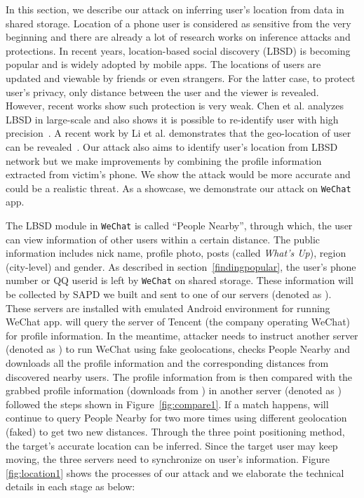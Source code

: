 \documentclass{sig-alternate}
\begin{document}
In this section, we describe our attack on inferring user's location from data in shared storage. Location of a phone user is considered as sensitive from the very beginning and there are already a lot of research works on inference attacks and protections. In recent years, location-based social discovery (LBSD) is becoming popular and is widely adopted by mobile apps. The locations of users are updated and viewable by friends or even strangers. For the latter case, to protect user's privacy, only distance between the user and the viewer is revealed. However, recent works show such protection is very weak. Chen et al. analyzes LBSD in large-scale and also shows it is possible to re-identify user with high precision~\cite{chen2013and}. A recent work by Li et al. demonstrates that the geo-location of user can be revealed~\cite{li2013all}. Our attack also aims to identify user's location from LBSD network but we make improvements by combining the profile information extracted from victim's phone. We show the attack would be more accurate and could be a realistic threat. As a showcase, we demonstrate our attack on \texttt{WeChat} app.



The LBSD module in \texttt{WeChat} is called ``People Nearby'', through which, the user can view information of other users within a certain distance. The public information includes nick name, profile photo, posts (called \textit{What's Up}), region (city-level) and gender. As described in section~\ref{findingpopular}, the user's phone number or QQ userid is left by \texttt{WeChat} on shared storage. These information will be collected by SAPD we built and sent to one of our servers (denoted as ). These servers are installed with emulated Android environment for running WeChat app.  will query the server of Tencent (the company operating WeChat) for profile information. In the meantime, attacker needs to instruct another server (denoted as ) to run WeChat using fake geolocations, checks People Nearby and downloads all the profile information and the corresponding distances from discovered nearby users. The profile information from  is then compared with the grabbed profile information (downloads from ) in another server (denoted as ) followed the steps shown in Figure~\ref{fig:compare1}. If a match happens,   will continue to query People Nearby for two more times using different geolocation (faked) to get two new distances. Through the three point positioning method, the target's accurate location can be inferred. Since the target user may keep moving, the three servers need to synchronize on user's information. Figure \ref{fig:location1} shows the processes of our attack and we elaborate the technical details in each stage as below:
\end{document}
